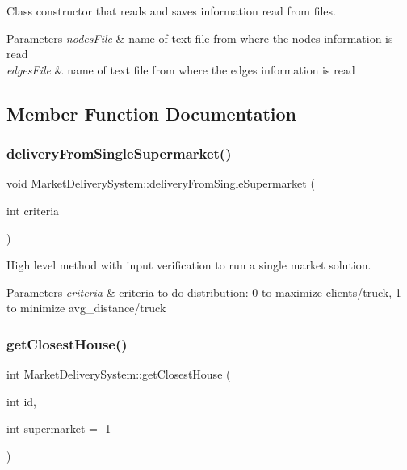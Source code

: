 Class constructor that reads and saves information read from files. 


\begin{DoxyParams}{Parameters}
{\em nodes\+File} & name of text file from where the nodes\textquotesingle{} information is read \\
\hline
{\em edges\+File} & name of text file from where the edges\textquotesingle{} information is read \\
\hline
\end{DoxyParams}


\subsection{Member Function Documentation}
\hypertarget{class_market_delivery_system_a9abaef04e2482bc4b5d01a1d9f10ec68}{}\label{class_market_delivery_system_a9abaef04e2482bc4b5d01a1d9f10ec68} 
\subsubsection{\texorpdfstring{delivery\+From\+Single\+Supermarket()}{deliveryFromSingleSupermarket()}}
{\footnotesize\ttfamily void Market\+Delivery\+System\+::delivery\+From\+Single\+Supermarket (\begin{DoxyParamCaption}\item[{int}]{criteria }\end{DoxyParamCaption})}



High level method with input verification to run a single market solution. 


\begin{DoxyParams}{Parameters}
{\em criteria} & criteria to do distribution\+: 0 to maximize clients/truck, 1 to minimize avg\+\_\+distance/truck \\
\hline
\end{DoxyParams}
\hypertarget{class_market_delivery_system_a6e527c880df486f29fa5df82ff140d17}{}\label{class_market_delivery_system_a6e527c880df486f29fa5df82ff140d17} 
\subsubsection{\texorpdfstring{get\+Closest\+House()}{getClosestHouse()}}
{\footnotesize\ttfamily int Market\+Delivery\+System\+::get\+Closest\+House (\begin{DoxyParamCaption}\item[{int}]{id,  }\item[{int}]{supermarket = {\ttfamily -\/1} }\end{DoxyParamCaption})}



